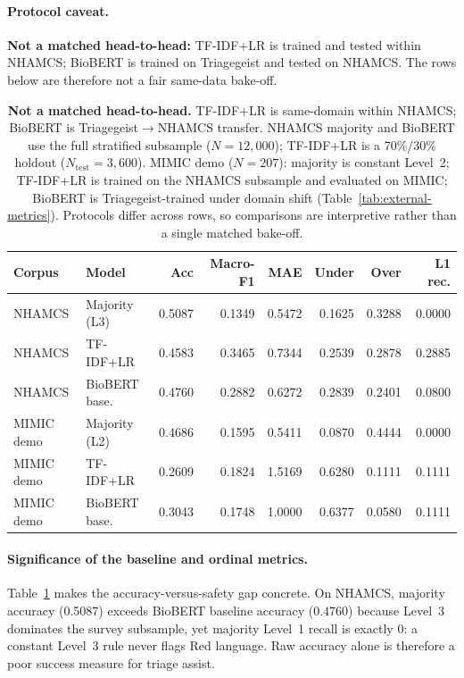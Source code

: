 \paragraph{Protocol caveat.}
\textbf{Not a matched head-to-head:} TF-IDF+LR is trained and tested within NHAMCS; BioBERT is trained on Triagegeist and tested on NHAMCS. The rows below are therefore not a fair same-data bake-off.

\begin{table}[H]
\centering
\footnotesize
\setlength{\tabcolsep}{3.5pt}
\begin{tabular}{|l|l|r|r|r|r|r|r|}
\hline
\textbf{Corpus} & \textbf{Model} & \textbf{Acc} & \textbf{Macro-F1} & \textbf{MAE} & \textbf{Under} & \textbf{Over} & \textbf{L1 rec.} \\
\hline
NHAMCS & Majority (L3) & 0.5087 & 0.1349 & 0.5472 & 0.1625 & 0.3288 & 0.0000 \\
NHAMCS & TF-IDF+LR & 0.4583 & 0.3465 & 0.7344 & 0.2539 & 0.2878 & 0.2885 \\
NHAMCS & BioBERT base. & 0.4760 & 0.2882 & 0.6272 & 0.2839 & 0.2401 & 0.0800 \\
\hline
MIMIC demo & Majority (L2) & 0.4686 & 0.1595 & 0.5411 & 0.0870 & 0.4444 & 0.0000 \\
MIMIC demo & TF-IDF+LR & 0.2609 & 0.1824 & 1.5169 & 0.6280 & 0.1111 & 0.1111 \\
MIMIC demo & BioBERT base. & 0.3043 & 0.1748 & 1.0000 & 0.6377 & 0.0580 & 0.1111 \\
\hline
\end{tabular}
\caption{\textbf{Not a matched head-to-head.} TF-IDF+LR is same-domain within NHAMCS; BioBERT is Triagegeist\(\rightarrow\)NHAMCS transfer. NHAMCS majority and BioBERT use the full stratified subsample (\(N=12{,}000\)); TF-IDF+LR is a 70\%/30\% holdout (\(N_{\mathrm{test}}=3{,}600\)). MIMIC demo (\(N=207\)): majority is constant Level~2; TF-IDF+LR is trained on the NHAMCS subsample and evaluated on MIMIC; BioBERT is Triagegeist-trained under domain shift (Table~\ref{tab:external-metrics}). Protocols differ across rows, so comparisons are interpretive rather than a single matched bake-off.}
\label{tab:simple-baselines}
\end{table}

\paragraph{Significance of the baseline and ordinal metrics.}
Table~\ref{tab:simple-baselines} makes the accuracy-versus-safety gap concrete. On NHAMCS, majority accuracy (0.5087) exceeds BioBERT baseline accuracy (0.4760) because Level~3 dominates the survey subsample, yet majority Level~1 recall is exactly \(0\): a constant Level~3 rule never flags Red language. Raw accuracy alone is therefore a poor success measure for triage assist.

